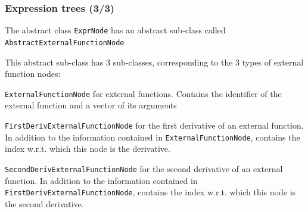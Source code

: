 \documentclass[aspectratio=169]{beamer}
\newenvironment{witemize}{\itemize\addtolength{\itemsep}{8pt}}{\enditemize}
\newenvironment{wenumerate}{\enumerate\addtolength{\itemsep}{8pt}}{\enditemize}
\begin{document}
\begin{frame}
  \frametitle{Expression trees (3/3)}
  \begin{witemize}
  \item The abstract class \texttt{ExprNode} has an abstract sub-class called \texttt{AbstractExternalFunctionNode}
  \item This abstract sub-class has 3 sub-classes, corresponding to the 3 types of external function nodes:
    \begin{wenumerate}
    \item \texttt{ExternalFunctionNode} for external functions. Contains the identifier of the external function and a vector of its arguments
    \item \texttt{FirstDerivExternalFunctionNode} for the first derivative of an external function. In addition to the information contained in \texttt{ExternalFunctionNode}, contains the index w.r.t. which this node is the derivative.
    \item \texttt{SecondDerivExternalFunctionNode} for the second derivative of an external function. In addition to the information contained in \texttt{FirstDerivExternalFunctionNode}, contains the index w.r.t. which this node is the second derivative.
    \end{wenumerate}
  \end{witemize}
\end{frame}
\end{document}

